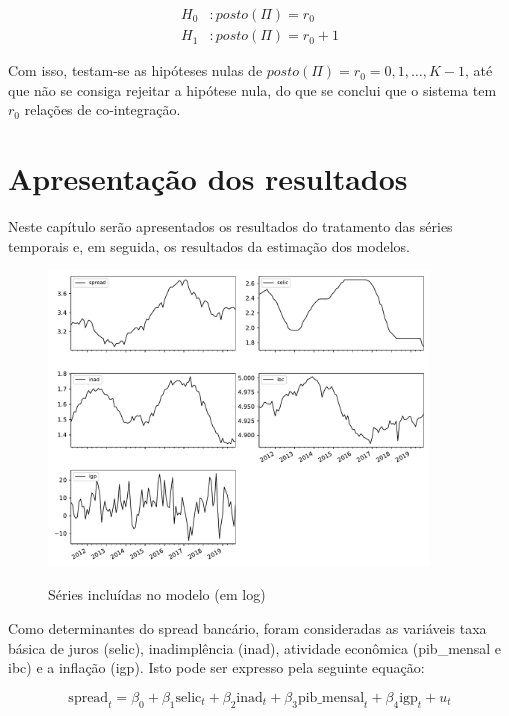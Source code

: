 \documentclass[a4paper,
               article,
               12pt,
               openany,
               oneside,
               english,
               brazil]{abntex2}
\numberwithin{equation}{section}
\begin{document}
   \begin{equation}
       \label{maxeig}
       \begin{aligned}
           H_0&: posto(\Pi) = r_0 \\
           H_1&: posto(\Pi) = r_0 + 1
       \end{aligned}
   \end{equation}

   Com isso, testam-se as hipóteses nulas de $ posto(\Pi) = r_0 = 0, 1, \dots, K-1 $, até que não se consiga rejeitar a hipótese nula, do que se conclui que o sistema tem $ r_0 $ relações de co-integração.

   \section{Apresentação dos resultados}

   Neste capítulo serão apresentados os resultados do tratamento das séries temporais e, em seguida, os resultados da estimação dos modelos.

    \begin{figure}[h]
        \centering
        \caption{Séries incluídas no modelo (em log)}
        \includegraphics[width = 0.9\textwidth, scale=1]{series_modelo.pdf}
        \label{graficos}
    \end{figure}

   Como determinantes do spread bancário, foram consideradas as variáveis taxa básica de juros (selic), inadimplência (inad), atividade econômica (pib\_mensal e ibc) e a inflação (igp). Isto pode ser expresso pela seguinte equação:

   \begin{equation}
       \label{equacao_modelo}
       \text{spread}_t = \beta_0 + \beta_1 \text{selic}_t + \beta_2 \text{inad}_t + \beta_3 \text{pib\_mensal}_t + \beta_4 \text{igp}_t + u_t
   \end{equation}
\end{document}

